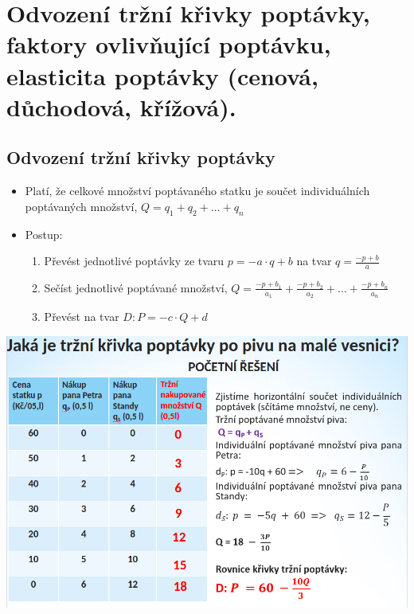 \clearpage
\section{Odvození tržní křivky poptávky, faktory ovlivňující poptávku, elasticita poptávky
(cenová, důchodová, křížová).}

\subsection{Odvození tržní křivky poptávky}
\begin{itemize}
    \item Platí, že celkové množství poptávaného statku je součet individuálních poptávaných množství, $Q=q_1+q_2+\dots +q_n$
    \item Postup:
    \begin{enumerate}
        \item Převést jednotlivé poptávky ze tvaru $p=-a\cdot q+b$ na tvar $q=\frac{-p+b}{a}$
        \item Sečíst jednotlivé poptávané množství, $Q=\frac{-p+b_1}{a_1}+\frac{-p+b_2}{a_2}+\dots+\frac{-p+b_n}{a_n}$
        \item Převést na tvar $D: P=-c\cdot Q+d$
    \end{enumerate}
\end{itemize}
\includegraphics[width=16cm]{images/07_odvozeni_poptavky.png}

